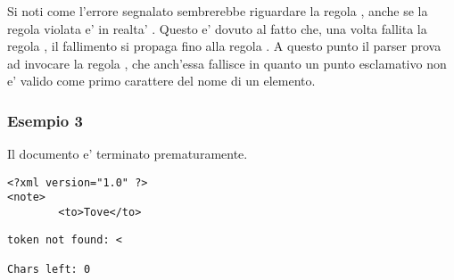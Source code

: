 \documentclass[italian,a4paper]{article}
\begin{document}
Si noti come l'errore segnalato sembrerebbe riguardare la regola ,
anche se la regola violata e' in realta' . Questo e'
dovuto al fatto che, una volta fallita la regola , il
fallimento si propaga fino alla regola . A questo punto il
parser prova ad invocare la regola , che anch'essa fallisce in
quanto un punto esclamativo non e' valido come primo carattere del nome di un
elemento.

\subsubsection{Esempio 3}

Il documento e' terminato prematuramente.

\begin{mdframed}[frametitle=Input]
\begin{verbatim}
<?xml version="1.0" ?>
<note>    
        <to>Tove</to>
\end{verbatim}
\end{mdframed}

\begin{mdframed}[frametitle=Output]
\begin{verbatim}
token not found: <

Chars left: 0
\end{verbatim}
\end{mdframed}
\end{document}
